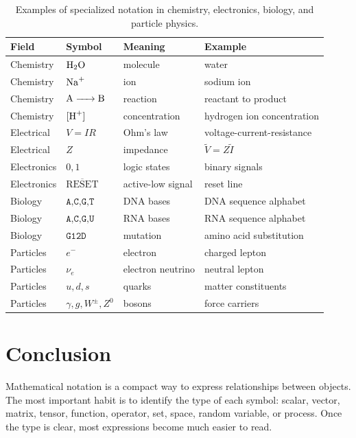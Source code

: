 \documentclass[11pt,twocolumn]{article}
\begin{document}
\begin{table}[t]
\centering
\small
\caption{Examples of specialized notation in chemistry, electronics, biology, and particle physics.}
\begin{tabular}{llll}
\toprule
Field & Symbol & Meaning & Example \\
\midrule
Chemistry & \(\ce{H2O}\) & molecule & water \\
Chemistry & \(\ce{Na+}\) & ion & sodium ion \\
Chemistry & \(\ce{A -> B}\) & reaction & reactant to product \\
Chemistry & \([\ce{H+}]\) & concentration & hydrogen ion concentration \\
Electrical & \(V=IR\) & Ohm's law & voltage-current-resistance \\
Electrical & \(Z\) & impedance & \(\tilde{V}=Z\tilde{I}\) \\
Electronics & \(0,1\) & logic states & binary signals \\
Electronics & \(\overline{\mathrm{RESET}}\) & active-low signal & reset line \\
Biology & \(\texttt{A,C,G,T}\) & DNA bases & DNA sequence alphabet \\
Biology & \(\texttt{A,C,G,U}\) & RNA bases & RNA sequence alphabet \\
Biology & \(\texttt{G12D}\) & mutation & amino acid substitution \\
Particles & \(e^-\) & electron & charged lepton \\
Particles & \(\nu_e\) & electron neutrino & neutral lepton \\
Particles & \(u,d,s\) & quarks & matter constituents \\
Particles & \(\gamma,g,W^\pm,Z^0\) & bosons & force carriers \\
\bottomrule
\end{tabular}
\end{table}

\section{Conclusion}

Mathematical notation is a compact way to express relationships between
objects. The most important habit is to identify the type of each symbol:
scalar, vector, matrix, tensor, function, operator, set, space, random
variable, or process. Once the type is clear, most expressions become much
easier to read.
\end{document}

